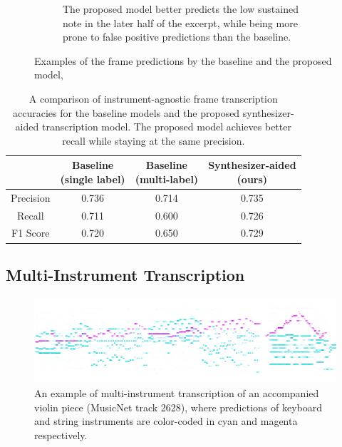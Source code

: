 \begin{figure}
\begin{subfigure}[b]{\textwidth}
	\caption{The proposed model better predicts the low sustained note in the later half of the excerpt, while being more prone to false positive predictions than the baseline.}
	\label{}
\end{subfigure}
\caption{Examples of the frame predictions by the baseline and the proposed model, }\label{fig:frame-prediction-excerpts}
\end{figure}

\begin{table}[b]
\centering\small
\begin{tabular}{c|ccc}
& \makecell{Baseline \\ (single label)} & \makecell{Baseline \\ (multi-label)} & \makecell{Synthesizer-aided \\ (ours)} \\ \hline
Precision & 0.736 & 0.714 & 0.735 \\
Recall & 0.711 & 0.600 & 0.726 \\
F1 Score & 0.720 & 0.650 & 0.729 \\
\end{tabular}
\vspace{1em}
\caption{A comparison of instrument-agnostic frame transcription accuracies for the baseline models and the proposed synthesizer-aided transcription model. The proposed model achieves better recall while staying at the same precision.}\label{tab:transcription-accuracy-comparison}
\end{table}

\subsection{Multi-Instrument Transcription}


\begin{figure}
\centering
\includegraphics[width=\textwidth]{2628.png}
\caption{An example of multi-instrument transcription of an accompanied violin piece (MusicNet track 2628), where predictions of keyboard and string instruments are color-coded in cyan and magenta respectively.}\label{fig:multi-instrument-example}
\end{figure}

